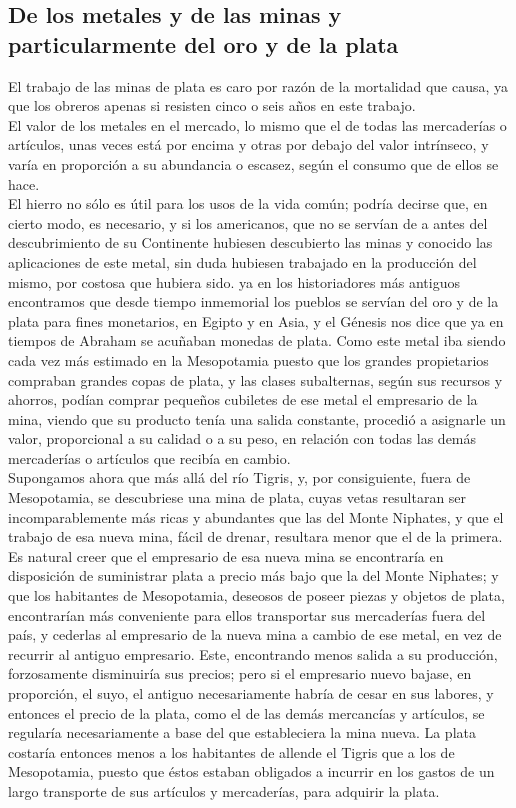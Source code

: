 \documentclass[10pt]{article}
\begin{document}
\begin{multicols}{1}
\section*{De los metales y de las minas y particularmente del oro y de la plata}
El trabajo de las minas de plata es caro por razón de la mortalidad que causa, ya que los obreros apenas si resisten cinco o seis años en este trabajo.\\
El valor de los metales en el mercado, lo mismo que el de todas las mercaderías o artículos, unas veces está por encima y otras por debajo del valor intrínseco, y varía en proporción a su abundancia o escasez, según el consumo que de ellos se hace.\\
El hierro no sólo es útil para los usos de la vida común; podría decirse que, en cierto modo, es necesario, y si los americanos, que no se servían de a antes del descubrimiento de su Continente hubiesen descubierto las minas y conocido las aplicaciones de este metal, sin duda hubiesen trabajado en la producción del mismo, por costosa que hubiera sido. ya en los historiadores más antiguos encontramos que desde tiempo inmemorial los pueblos se servían del oro y de la plata para fines monetarios, en Egipto y en Asia, y el Génesis nos dice que ya en tiempos de Abraham se acuñaban monedas de plata.
Como este metal iba siendo cada vez más estimado en la Mesopotamia puesto que los grandes propietarios compraban grandes copas de plata, y las clases subalternas, según sus recursos y ahorros, podían comprar pequeños cubiletes de ese metal el empresario de la mina, viendo que su producto tenía una salida constante, procedió a asignarle un valor, proporcional a su calidad o a su peso, en relación con todas las demás mercaderías o artículos que recibía en cambio.\\
Supongamos ahora que más allá del río Tigris, y, por consiguiente, fuera de Mesopotamia, se descubriese una mina de plata, cuyas vetas resultaran ser incomparablemente más ricas y abundantes que las del Monte Niphates, y que el trabajo de esa nueva mina, fácil de drenar, resultara menor que el de la primera. Es natural creer que el empresario de esa nueva mina se encontraría en disposición de suministrar plata a precio más bajo que la del Monte Niphates; y que los habitantes de Mesopotamia, deseosos de poseer piezas y objetos de plata, encontrarían más conveniente para ellos transportar sus mercaderías fuera del país, y cederlas al empresario de la nueva mina a cambio de ese metal, en vez de recurrir al antiguo empresario. Este, encontrando menos salida a su producción, forzosamente disminuiría sus precios; pero si el empresario nuevo bajase, en proporción, el suyo, el antiguo necesariamente habría de cesar en sus labores, y entonces el precio de la plata, como el de las demás mercancías y artículos, se regularía necesariamente a base del que estableciera la mina nueva. La plata costaría entonces menos a los habitantes de allende el Tigris que a los de Mesopotamia, puesto que éstos estaban obligados a incurrir en los gastos de un largo transporte de sus artículos y mercaderías, para adquirir la plata.

\end{multicols}
\end{document}
